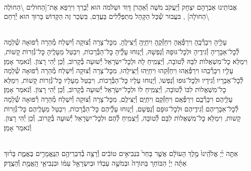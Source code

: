 \documentclass[twoside, openany, parskip=half, 11pt]{book}
\begin{document}
\begin{sometimes}
\\
אֲבוֹתֵינוּ אַבְרָהָם יִצְחָק וְ֯יַעֲקֹב מֹשֶׁה וְ֯אַהֲרֹן דָּוִד וּשְׁלֹמֹה הוּא יְ֯בָרֵךְ וִירַפֵּא אֶת־[הַחוׂלִים \textbackslash הַחוׂלֶה \textbackslash הַחוׂלָה]
,
בּעֲבוּר שְׁ֯כָּל הַקָּהָל מִתְפַּלְ֯לִים בַּעֲדָם, בִּשְׂכַר זֶה
הַקָּדוֹשׁ בָּרוּךְ הוּא יְ֯רַחֵם
\setcolumnwidth{1.4in,1.4in,1.4in}
\begin{paracol}{3}
\\
עָלֵָיהָ וִיבָרְ֯כֶֽהָ וִירַפְּ֯אֶֽהָ וִיחַזְּ֯קֶֽהָ וִיחַיֶּֽהָ וְ֯יַצִּילֶֽהָ, מִכׇּל־צָרָה וְ֯צוּקָה וְ֯יִשְׁלַח מְ֯הֵרָה רְ֯פוּאָה שְׁ֯לֵמָה לְ֯כׇל־אֵבָרָיהָ וְ֯גִידֶֽיהָ וּלְכׇל־גּוּפָהּ וְ֯נַפְשָׁהּ, וְ֯יָנֽוּחוּ עָלְֶ֯יהָ כׇּל־הַבְּ֯רָכוׂת, וִיבַטֵּל מֵעָלֶֽיהָ כׇּל־גְּ֯זֵרוׂת קָשׁוׂת, וִימַלֵּא כׇל־מִשְׁאֲלוׂת לִבָּהּ לְ֯טוׂבָה, וְ֯יַצְמִֽיחַ לָהּ וּלְכׇל־יִשְׂרָאֵל יְ֯שׁוּעָה בְּ֯קָרוׂב, וְ֯כֵן יְ֯הִי רָצוׂן. וְ֯נֹאמַר אָמֵן׃
\switchcolumn
{}\\
עָלֵָיו וִיבָרְ֯כֵֽהוּ וִירַפְּ֯אֵֽהוּ וִיחַזְּ֯קֵהוּ וִיחַיֵּֽהוּ וְ֯יַצִּילֵֽהוּ, מִכׇּל־צָרָה וְ֯צוּקָה וְ֯יִשְׁלַח מְ֯הֵרָה רְ֯פוּאָה שְׁ֯לֵמָה לְ֯כׇל־אֵבָרָיו וְ֯גִידָיו וּלְכׇל־גּוּפוּ וְ֯נַפְשׁוׂ, וְ֯יָנֽוּחוּ עָלָיו כׇּל־הַבְּ֯רָכוׂת, וִיבַטֵּל מֵעָלָיו כׇּל־גְּ֯זֵרוׂת קָשׁוׂת, וִימַלֵּא כׇל־מִשְׁאֲלוׂת לִבּוׂ לְ֯טוׂבָה, וְ֯יַצְמִֽיחַ לוׂ וּלְכׇל־יִשְׂרָאֵל יְ֯שׁוּעָה בְּ֯קָרוׂב, וְ֯כֵן יְ֯הִי רָצוׂן. וְ֯נֹאמַר אָמֵן׃
\switchcolumn
{}\\
עָלֵָיהֶם וִיבָרְ֯כְֶם וִירַפְּ֯אֶֽם וִיחַזְּ֯קֶֽם וִיחַיֶּֽם וְ֯יַצִּילֶֽם, מִכׇּל־צָרָה וְ֯צוּקָה וְ֯יִשְׁלַח מְ֯הֵרָה רְ֯פוּאָה שְׁ֯לֵמָה לְ֯כׇל־אֵבָרָיהֶם וְ֯גִידֶֽיהֶם וּלְכׇל־גּוּפָם וְ֯נַפְשָׁם, וְ֯יָנֽוּחוּ עָלְֶ֯יהֶם כׇּל־הַבְּ֯רָכוׂת, וִיבַטֵּל מֵעָלֶֽיהֶם כׇּל־גְּ֯זֵרוׂת קָשׁוׂת, וִימַלֵּא כׇל־מִשְׁאֲלוׂת לִבָּם לְ֯טוׂבָה, וְ֯יַצְמִֽיחַ לְ֯הֶם וּלְכׇל־יִשְׂרָאֵל יְ֯שׁוּעָה בְּ֯קָרוׂב, וְ֯כֵן יְ֯הִי רָצוׂן. וְ֯נֹאמַר אָמֵן׃
\end{paracol}

\end{sometimes}

\halfkaddish

\hagbaha


\\
אַתָּ֤ה יְ֙יָ אֱלֹ֙הֵֽינוּ֙ מֶ֣לֶךְ הָעוֹלָ֔ם אֲשֶׁ֤ר בָּחַר֙ בִּנְבִיאִ֣ים טוֹבִ֔ים וְ֯רָצָ֥ה בְ֯דִבְרֵיהֶ֖ם הַנֶּֽאֱמָרִ֣ים בֶּאֱמֶ֑ת בָּר֨וּךְ אַתָּ֜ה יְיָ֗ הַבּוֹחֵר֚ בַּתּוֹרָה֙ וּבְמֹשֶׁ֣ה עַבְדּ֔וֹ וּבְיִשְׂרָאֵ֣ל עַמּ֔וֹ וּבִנְבִיאֵ֥י הָֽאֱמֶ֖ת וְ֯הַצֶֽדֶק׃
\end{document}
